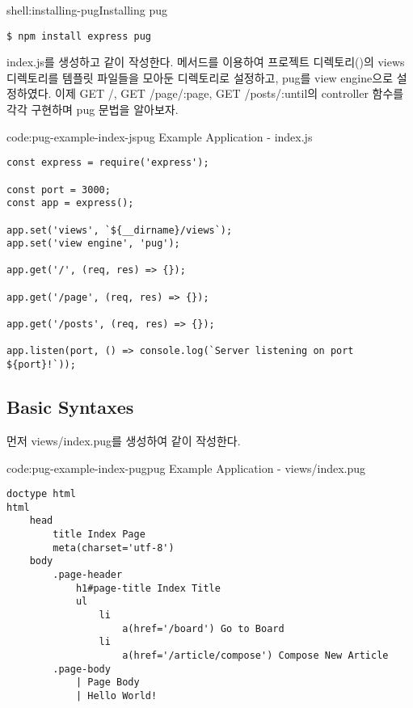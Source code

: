 \begin{shellenv}{shell:installing-pug}{Installing pug}\begin{verbatim}
$ npm install express pug
\end{verbatim}
\end{shellenv}

index.js를 생성하고 \와 같이 작성한다.  메서드를 이용하여 프로젝트 디렉토리()의 views 디렉토리를 템플릿 파일들을 모아둔 디렉토리로 설정하고, pug를 view engine으로 설정하였다. 이제 GET /, GET /page/:page, GET /posts/:until의 controller 함수를 각각 구현하며 pug 문법을 알아보자.

\begin{codeenv}{code:pug-example-index-js}{pug Example Application - index.js}\begin{verbatim}
const express = require('express');

const port = 3000;
const app = express();

app.set('views', `${__dirname}/views`);
app.set('view engine', 'pug');

app.get('/', (req, res) => {});

app.get('/page', (req, res) => {});

app.get('/posts', (req, res) => {});

app.listen(port, () => console.log(`Server listening on port ${port}!`));
\end{verbatim}
\end{codeenv}

\subsection*{Basic Syntaxes}

먼저 views/index.pug를 생성하여 \와 같이 작성한다.

\begin{codeenv}{code:pug-example-index-pug}{pug Example Application - views/index.pug}\begin{verbatim}
doctype html
html
    head
        title Index Page
        meta(charset='utf-8')
    body
        .page-header
            h1#page-title Index Title
            ul
                li
                    a(href='/board') Go to Board
                li
                    a(href='/article/compose') Compose New Article
        .page-body
            | Page Body
            | Hello World!
\end{verbatim}
\end{codeenv}

